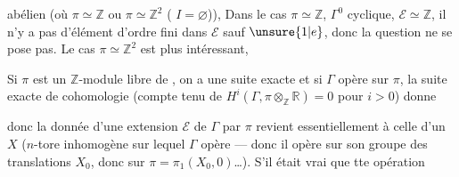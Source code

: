 

abélien (où \(\pi\simeq\mathbb Z\)
ou \(\pi\simeq\mathbb Z^2\) ( \(I=\varnothing\))),
Dans le  cas
 \(\pi\simeq\mathbb Z\), 
\(\Gamma^0\) cyclique, \(\mathcal E\simeq\mathbb Z\),
il n'y a pas d'élément d'ordre fini dans \(\mathcal E\) sauf
\(\unsure{1|e}\), donc la question ne se pose pas.
Le cas \(\pi\simeq\mathbb Z^2\) est plus intéressant,

Si \(\pi\) est un \(\mathbb Z\)-module libre de
, on a une suite exacte
et si \(\Gamma\) opère sur \(\pi\), la suite exacte de cohomologie
(compte tenu de \(H^i(\Gamma,\pi\otimes_{\mathbb Z}\mathbb R)=0\)
pour \(i>0\)) donne

donc la donnée d'une extension \(\mathcal E\) de \(\Gamma\) par \(\pi\)
revient essentiellement à celle d'un
 \(X\)
(\(n\)-tore inhomogène sur lequel \(\Gamma\) opère --- donc il opère
sur son groupe des translations \(X_0\), donc sur
\(\pi=\pi_1(X_0,0)\)\ldots).
S'il était vrai  que tte opération


